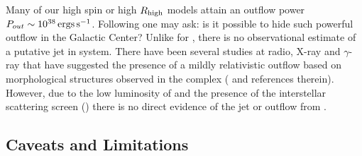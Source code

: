 Many of our high spin or high $R_\mathrm{high}$ models attain an outflow power $P_{out} \sim 10^{38} \,\mathrm{ergs\,s^{-1}}$. Following \citet{2007MNRAS.379.1519M} one may ask: is it possible to hide such powerful outflow in the Galactic Center? Unlike for , there is no observational estimate of a putative jet in \sgra system. There have been several studies at radio, X-ray and $\gamma$-ray that have suggested the presence of a mildly relativistic outflow based on morphological structures observed in the \sgra complex (\citealt{2012ApJ...758L..11Y,2012AAS...22051303S,Li_2013,2019ApJ...875...44Z,2021arXiv210713402B} and references therein). However, due to the low luminosity of \sgra and the presence of the interstellar scattering screen (\citealt{2016ApJ...824...40O,2017MNRAS.471.3563D,2018ApJ...865..104J,2019A&A...621A.119B}) there is no direct evidence of the jet or outflow from \sgra. 
 

\subsection{Caveats and Limitations}\label{sec:limits}





